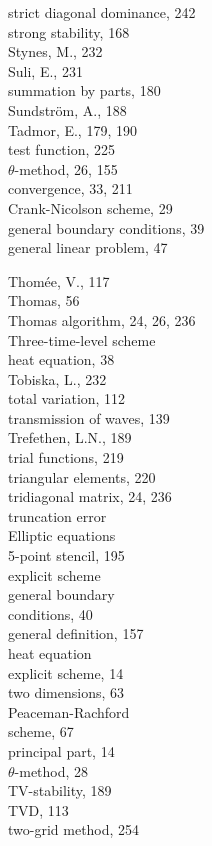 \documentclass[10pt]{article}
\begin{document}
strict diagonal dominance, 242\\
strong stability, 168\\
Stynes, M., 232\\
Suli, E., 231\\
summation by parts, 180\\
Sundström, A., 188\\
Tadmor, E., 179, 190\\
test function, 225\\
\(\theta\)-method, 26, 155\\
convergence, 33, 211\\
Crank-Nicolson scheme, 29\\
general boundary conditions, 39\\
general linear problem, 47

Thomée, V., 117\\
Thomas, 56\\
Thomas algorithm, 24, 26, 236\\
Three-time-level scheme\\
heat equation, 38\\
Tobiska, L., 232\\
total variation, 112\\
transmission of waves, 139\\
Trefethen, L.N., 189\\
trial functions, 219\\
triangular elements, 220\\
tridiagonal matrix, 24, 236\\
truncation error\\
Elliptic equations\\
5-point stencil, 195\\
explicit scheme\\
general boundary\\
conditions, 40\\
general definition, 157\\
heat equation\\
explicit scheme, 14\\
two dimensions, 63\\
Peaceman-Rachford\\
scheme, 67\\
principal part, 14\\
\(\theta\)-method, 28\\
TV-stability, 189\\
TVD, 113\\
two-grid method, 254\\
\end{document}
